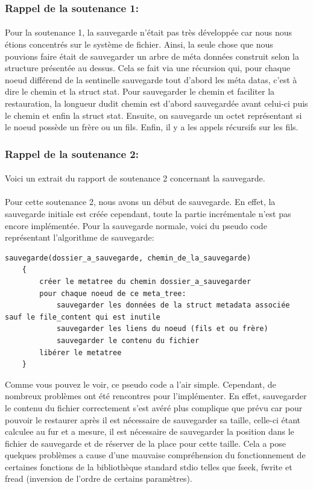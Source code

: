         \subsubsection{Rappel de la soutenance 1:}
            \paragraph*{}
            Pour la soutenance 1, la sauvegarde n'était pas très développée car nous nous étions concentrés sur le système de fichier. Ainsi, la seule chose que nous pouvions faire était de sauvegarder un arbre de méta données construit selon la structure présentée au dessus. Cela se fait via une récursion qui, pour chaque noeud différend de la sentinelle sauvegarde tout d'abord les méta datas, c'est à dire le chemin et la struct stat. Pour sauvegarder le chemin et faciliter la restauration, la longueur dudit chemin est d'abord sauvegardée avant celui-ci puis le chemin et enfin la struct stat. Ensuite, on sauvegarde un octet représentant si le noeud possède un frère ou un fils. Enfin, il y a les appels récursifs sur les fils.
        \subsubsection{Rappel de la soutenance 2:}
            \paragraph*{}
            Voici un extrait du rapport de soutenance 2 concernant la sauvegarde.
            \paragraph*{}
            Pour cette soutenance 2, nous avons un début de sauvegarde. En effet, la sauvegarde initiale est créée cependant, toute la partie incrémentale n'est pas encore implémentée. Pour la sauvegarde normale, voici du pseudo code représentant l'algorithme de sauvegarde:
            \begin{lstlisting}[style=CStyle]
    sauvegarde(dossier_a_sauvegarde, chemin_de_la_sauvegarde)
    {
        créer le metatree du chemin dossier_a_sauvegarder
        pour chaque noeud de ce meta_tree:
            sauvegarder les données de la struct metadata associée sauf le file_content qui est inutile
            sauvegarder les liens du noeud (fils et ou frère)
            sauvegarder le contenu du fichier
        libérer le metatree
    }
		    \end{lstlisting}
		    Comme vous pouvez le voir, ce pseudo code a l'air simple. Cependant, de nombreux problèmes ont été rencontres pour l'implémenter. En effet, sauvegarder le contenu du fichier correctement s'est avéré plus complique que prévu car pour pouvoir le restaurer après il est nécessaire de sauvegarder sa taille, celle-ci étant calculee au fur et a mesure, il est nécessaire de sauvegarder la position dans le fichier de sauvegarde et de réserver de la place pour cette taille. Cela a pose quelques problèmes a cause d'une mauvaise compréhension du fonctionnement de certaines fonctions de la bibliothèque standard stdio telles que fseek, fwrite et fread (inversion de l'ordre de certains paramètres).
